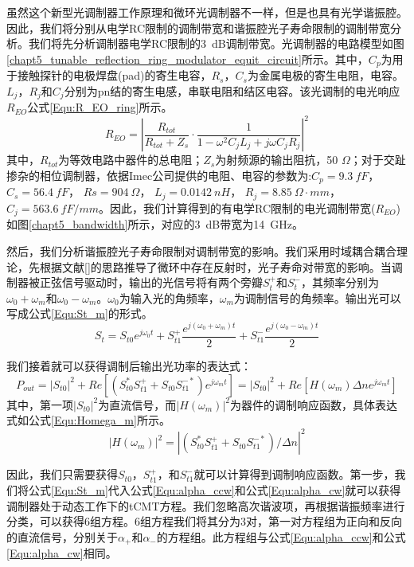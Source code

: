 虽然这个新型光调制器工作原理和微环光调制器不一样，但是也具有光学谐振腔。因此，我们将分别从电学RC限制的调制带宽和谐振腔光子寿命限制的调制带宽分析。我们将先分析调制器电学RC限制的3~dB调制带宽。光调制器的电路模型如图\ref{chapt5_tunable_reflection_ring_modulator_equit_circuit}所示。其中，$C_p$为用于接触探针的电极焊盘(pad)的寄生电容，$R_s$，$C_s$为金属电极的寄生电阻，电容。$L_j$，$R_j$和$C_j$分别为pn结的寄生电感，串联电阻和结区电容。该光调制的电光响应$R_{EO}$公式\ref{Equ:R_EO_ring}所示。
\begin{equation}
\label{Equ:R_EO_ring}
R_{EO} = \left|\frac{R_{tot}}{R_{tot}+Z_s}\cdot\frac{1}{1-\omega^2C_jL_j+j\omega C_j R_j}\right|^2
\end{equation}
其中，$R_{tot}$为等效电路中器件的总电阻；$Z_s$为射频源的输出阻抗，50 $\Omega$；对于交趾掺杂的相位调制器，依据Imec公司\cite{Imec}提供的电阻、电容的参数为:$C_p = 9.3~fF$， $C_s = 56.4~fF$， $Rs = 904~\Omega$， $L_j = 0.0142~nH$， $R_j = 8.85~\Omega\cdot mm$， $C_j = 563.6~fF/mm$。因此，我们计算得到的有电学RC限制的电光调制带宽($R_{EO}$)如图\ref{chapt5_bandwidth}所示，对应的3~dB带宽为14~GHz。

然后，我们分析谐振腔光子寿命限制对调制带宽的影响。我们采用时域耦合耦合理论，先根据文献[]的思路推导了微环中存在反射时，光子寿命对带宽的影响。当调制器被正弦信号驱动时，输出的光信号将有两个旁瓣$S_{t}^+$和$S_{t}^-$，其频率分别为$\omega_0+\omega_m$和$\omega_0-\omega_m$。$\omega_0$为输入光的角频率，$\omega_m$为调制信号的角频率。输出光可以写成公式\ref{Equ:St_m}的形式。
\begin{equation}
\label{Equ:St_m}
S_t = S_{t0}e^{j\omega_0t}+S_{t1}^+\frac{e^{j(\omega_0+\omega_m)t}}{2}+S_{t1}^-\frac{e^{j(\omega_0-\omega_m)t}}{2}
\end{equation}

我们接着就可以获得调制后输出光功率的表达式：
\begin{equation}
\label{Equ:Pout_m}
P_{out} = |S_{t0}|^2+Re\left[(S_{t0}^*S_{t1}^{+}+S_{t0}S_{t1}^{-*})e^{j\omega_mt} \right]=|S_{t0}|^2+Re\left[H(\omega_m)\Delta n e^{j\omega_mt}\right]
\end{equation}
其中，第一项$|S_{t0}|^2$为直流信号，而$|H(\omega_m)|^2$为器件的调制响应函数，具体表达式如公式\ref{Equ:Homega_m}所示。
\begin{equation}
\label{Equ:Homega_m}
 |H(\omega_m)|^2 = |(S_{t0}^*S_{t1}^{+}+S_{t0}S_{t1}^{-*})/\Delta n|^2 
\end{equation}

因此，我们只需要获得$S_{t0}$，$S_{t1}^+$，和$S_{t1}^-$就可以计算得到调制响应函数。第一步，我们将公式\ref{Equ:St_m}代入公式\ref{Equ:alpha_ccw}和公式\ref{Equ:alpha_cw}就可以获得调制器处于动态工作下的tCMT方程。我们忽略高次谐波项，再根据谐振频率进行分类，可以获得6组方程。6组方程我们将其分为3对，第一对方程组为正向和反向的直流信号，分别关于$\alpha_+$和$\alpha_-$的方程组。此方程组与公式\ref{Equ:alpha_ccw}和公式\ref{Equ:alpha_cw}相同。

